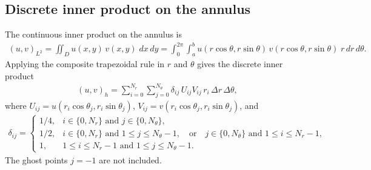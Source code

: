\documentclass[11pt]{article}
\begin{document}
\subsection{Discrete inner product on the annulus}
The continuous inner product on the annulus is
\begin{align*}
(u,v)_{L^2}=\iint_D u(x,y)\,v(x,y)\;dx\,dy=\int_{0}^{2\pi}\int_a^b u(r\cos \theta,r\sin \theta)\,v(r\cos \theta,r\sin\theta)\;r\, dr\, d\theta.
\end{align*}
Applying the composite trapezoidal rule in $r$ and $\theta$ gives the discrete inner product
\begin{align*}
(u,v)_{h}=\sum_{i=0}^{N_r}\sum_{j=0}^{N_\theta} \delta_{ij}\,U_{ij}V_{ij}\, r_i \,\Delta r\,\Delta \theta,
\end{align*}
where $U_{ij}=u(r_i\cos\theta_j,r_i\sin\theta_j)$, $V_{ij}=v(r_i\cos\theta_j,r_i\sin\theta_j)$, and
\begin{align*}
\delta_{ij}=\begin{cases}
1/4, & i\in\{0,N_r\} \text{ and } j\in\{0,N_\theta\},\\
1/2, & i\in\{0,N_r\} \text{ and } 1\leq j\leq N_\theta-1, \quad \text{or} \quad j\in\{0,N_\theta\} \text{ and } 1\leq i\leq N_r-1,\\
1, & 1\leq i\leq N_r-1 \text{ and } 1\leq j\leq N_\theta-1.
\end{cases}
\end{align*}
The ghost points $j=-1$ are not included.
\end{document}
